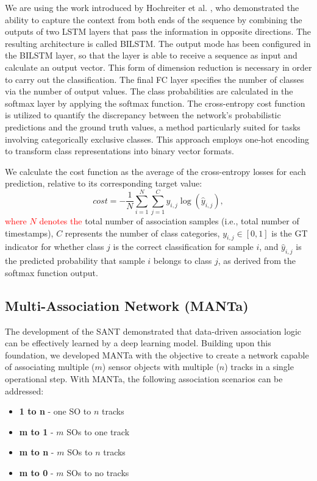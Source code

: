 \documentclass[letterpaper, 10 pt, journal, twoside]{IEEEtran}
\newcommand{\red}[1]{\textcolor{red}{#1}}
\begin{document}
We are using the work introduced by Hochreiter et al. {\cite{DL_LSTM.1997}}, who demonstrated the ability to capture the context from both ends of the sequence by combining the outputs of two LSTM layers that pass the information in opposite directions.
The resulting architecture is called \ac{BILSTM}.
The output mode has been configured in the \ac{BILSTM} layer, so that the layer is able to receive a sequence as input and calculate an output vector.
This form of dimension reduction is necessary in order to carry out the classification.
The final FC layer specifies the number of classes via the number of output values.
The class probabilities are calculated in the softmax layer by applying the softmax function.
The cross-entropy cost function is utilized to quantify the discrepancy between the network's probabilistic predictions and the ground truth values, a method particularly suited for tasks involving categorically exclusive classes.
This approach employs one-hot encoding to transform class representations into binary vector formats.

We calculate the cost function as the average of the cross-entropy losses for each prediction, relative to its corresponding target value:
\begin{equation}
    cost = -\frac{1}{N} \sum_{i=1}^{N} \sum_{j=1}^{C} y_{i,j} \log(\hat{y}_{i,j}),
\end{equation}
\noindent
\red{where $N$ denotes the} total number of association samples (i.e., total number of timestamps), $C$ represents the number of class categories, $y_{i,j}\in [0,1]$ is the GT indicator for whether class $j$ is the correct classification for sample $i$, and $\hat{y}_{i,j}$ is the predicted probability that sample $i$ belongs to class $j$, as derived from the softmax function output.

\subsection{Multi-Association Network (MANTa)}
The development of the \ac{SANT} demonstrated that data-driven association logic can be effectively learned by a deep learning model.
Building upon this foundation, we developed MANTa with the objective to create a network capable of associating multiple ($m$) sensor objects with multiple ($n$) tracks in a single operational step.
With MANTa, the following association scenarios can be addressed:

\begin{itemize}
    \item \textbf{1 to n} - one \ac{SO} to $n$ tracks %
    \item \textbf{m to 1} - $m$ \acp{SO} to one track
    \item \textbf{m to n} - $m$ \acp{SO} to $n$ tracks
    \item \textbf{m to 0} - $m$ \acp{SO} to no tracks
\end{itemize}
\end{document}
